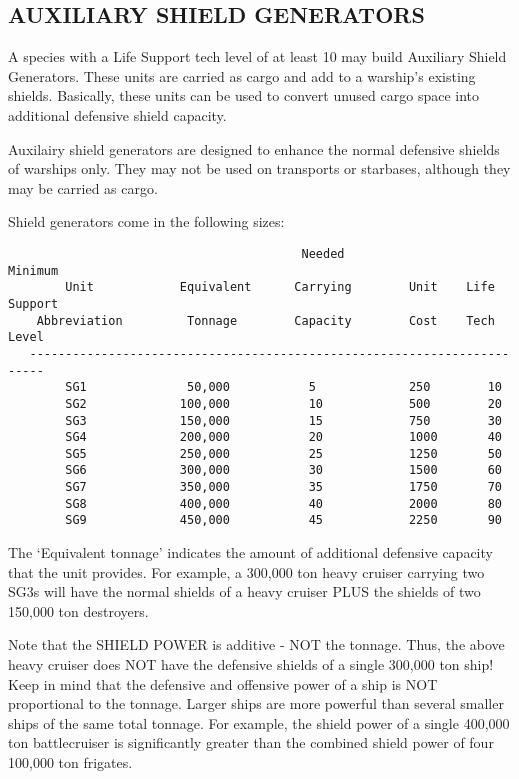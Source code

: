 \documentclass[10pt,titlepage]{article}
\begin{document}
\subsection{AUXILIARY SHIELD GENERATORS}

A species with a Life Support tech level of at least 10 may build Auxiliary
Shield Generators.  These units are carried as cargo and add to a warship's
existing shields.  Basically, these units can be used to convert unused cargo
space into additional defensive shield capacity.

Auxilairy shield generators are designed to enhance the normal defensive
shields of warships only.  They may not be used on transports or starbases,
although they may be carried as cargo.

Shield generators come in the following sizes:

\begin{verbatim}
                                         Needed                  Minimum
        Unit            Equivalent      Carrying        Unit    Life Support
    Abbreviation         Tonnage        Capacity        Cost    Tech Level
   ------------------------------------------------------------------------
        SG1              50,000           5             250        10
        SG2             100,000           10            500        20
        SG3             150,000           15            750        30
        SG4             200,000           20            1000       40
        SG5             250,000           25            1250       50
        SG6             300,000           30            1500       60
        SG7             350,000           35            1750       70
        SG8             400,000           40            2000       80
        SG9             450,000           45            2250       90\end{verbatim} 


The `Equivalent tonnage' indicates the amount of additional defensive capacity
that the unit provides.  For example, a 300,000 ton heavy cruiser carrying two
SG3s will have the normal shields of a heavy cruiser PLUS the shields of two
150,000 ton destroyers.

\begin{informationnote}
Note that the SHIELD POWER is additive - NOT the tonnage.  Thus, the above
heavy cruiser does NOT have the defensive shields of a single 300,000 ton
ship!  Keep in mind that the defensive and offensive power of a ship is NOT
proportional to the tonnage.  Larger ships are more powerful than several
smaller ships of the same total tonnage.  For example, the shield power of a
single 400,000 ton battlecruiser is significantly greater than the combined
shield power of four 100,000 ton frigates.
\end{informationnote}
\end{document}
